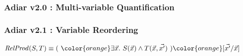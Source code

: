 \documentclass[english, aspectratio=169]{beamer}
\begin{document}
\begin{frame}
  \frametitle{Adiar v2.0 : Multi-variable Quantification}

  
\end{frame}

\blankframe

\begin{frame}
  \frametitle{Adiar v2.1 : Variable Reordering}

  \begin{center}
    \LARGE

    $\mathit{RelProd}(S,T)
    \equiv
    (
    \ {\color{orange}}\exists \vec{x} .\
    S(\vec{x}) \wedge T(\vec{x}, \vec{x'})
    \ ) {\color{orange} [\vec{x'} / \vec{x}]}$
  \end{center}
\end{frame}
\end{document}
